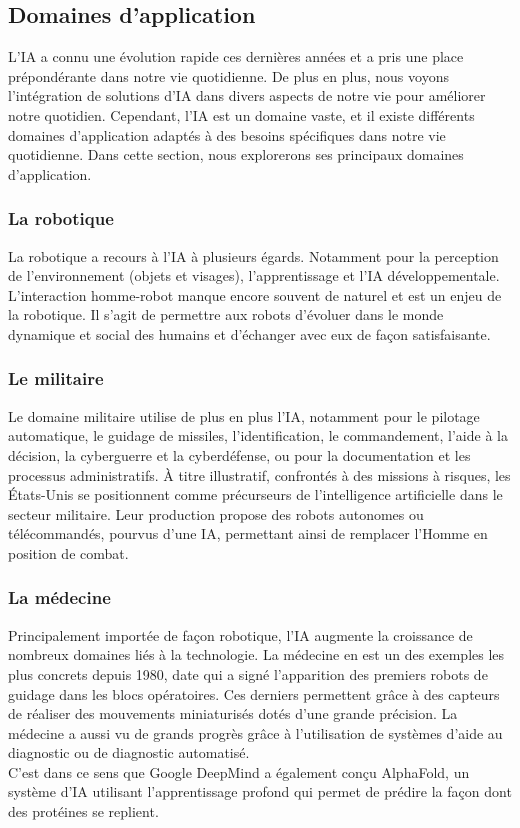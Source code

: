 \subsection{Domaines d'application}
L'IA a connu une évolution rapide ces dernières années et a pris une place prépondérante dans notre vie quotidienne. De plus en plus, nous voyons l'intégration de solutions d'IA dans divers aspects de notre vie pour améliorer notre quotidien. Cependant, l'IA est un domaine vaste, et il existe différents domaines d'application adaptés à des besoins spécifiques dans notre vie quotidienne. Dans cette section, nous explorerons ses principaux domaines d'application. 

\subsubsection{La robotique} La robotique a recours à l'IA à plusieurs égards. Notamment pour la perception de l'environnement (objets et visages), l'apprentissage et l'IA développementale. L'interaction homme-robot manque encore souvent de naturel et est un enjeu de la robotique. Il s'agit de permettre aux robots d'évoluer dans le monde dynamique et social des humains et d'échanger avec eux de façon satisfaisante. 

\subsubsection{Le militaire} Le domaine militaire utilise de plus en plus l'IA, notamment pour le pilotage automatique, le guidage de missiles, l'identification, le commandement, l'aide à la décision, la cyberguerre et la cyberdéfense, ou pour la documentation et les processus administratifs. À titre illustratif, confrontés à des missions à risques, les États-Unis se positionnent comme précurseurs de l’intelligence artificielle dans le secteur militaire. Leur production propose des robots autonomes ou télécommandés, pourvus d’une IA, permettant ainsi de remplacer l’Homme en position de combat.
 
\subsubsection{La médecine} Principalement importée de façon robotique, l’IA augmente la croissance de nombreux domaines liés à la technologie. La médecine en est un des exemples les plus concrets depuis 1980, date qui a signé l’apparition des premiers robots de guidage dans les blocs opératoires. Ces derniers permettent grâce à des capteurs de réaliser des mouvements miniaturisés dotés d’une grande précision. La médecine a aussi vu de grands progrès grâce à l'utilisation de systèmes d'aide au diagnostic ou de diagnostic automatisé. \\ C'est dans ce sens que Google DeepMind a également conçu AlphaFold, un système d'IA utilisant l'apprentissage profond qui permet de prédire la façon dont des protéines se replient. 

